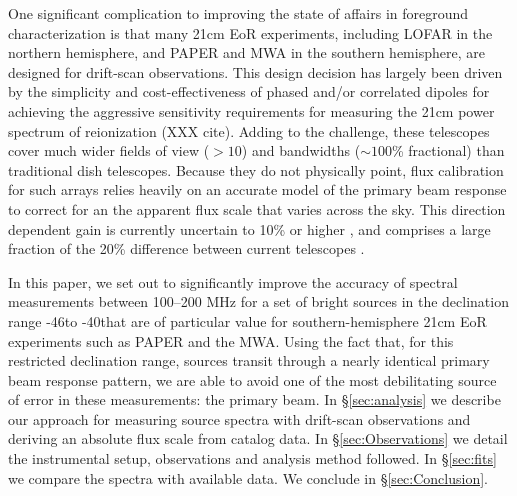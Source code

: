 \documentclass[preprint]{aastex}
\begin{document}
One significant complication to improving the state of affairs in foreground characterization
is that many 21cm EoR experiments, including LOFAR in the northern hemisphere, and
PAPER and MWA in the southern hemisphere, are designed for drift-scan observations.
This design decision has largely been driven by the simplicity and cost-effectiveness of
phased and/or correlated dipoles for achieving the aggressive sensitivity requirements
for measuring the 21cm power spectrum of reionization (XXX cite).
Adding to the challenge, these telescopes 
cover much wider fields of view ($>10$\arcdeg) and bandwidths
($\sim 100$\% fractional) than traditional dish telescopes.
Because they do not physically point, flux calibration for such arrays relies heavily
on an accurate model of the primary beam response to correct for an
the apparent flux scale that varies across the sky.
This direction dependent gain is currently uncertain to 10\% or higher
\citep{Pober:2012p8800}, and comprises a large fraction of the 20\% difference between current telescopes \citep{Jacobs:2013p9713}.

In this paper, we set out to significantly improve the accuracy of spectral measurements between 
100--200 MHz for a set of bright sources in the declination range -46\arcdeg to -40\arcdeg that
are of particular value for southern-hemisphere 21cm EoR experiments such as PAPER and the MWA.
Using the fact that, for this restricted declination range,
sources transit through a nearly identical primary beam response pattern, we are able to avoid one of the
most debilitating source of error in these measurements: the primary beam.  
In \S\ref{sec:analysis} we describe our approach for measuring source spectra with
drift-scan observations and deriving an absolute flux scale from catalog data.  
In \S\ref{sec:Observations} we detail the instrumental 
setup, observations and analysis method followed. In \S\ref{sec:fits} we
compare the spectra with available data.  We conclude in 
\S\ref{sec:Conclusion}.


\end{document}
